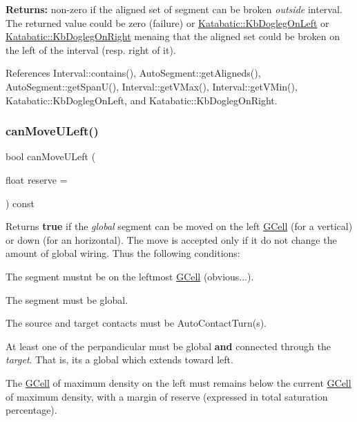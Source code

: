 {\bfseries Returns\+:} non-\/zero if the aligned set of segment can be broken {\itshape outside} {\ttfamily interval}. The returned value could be zero (failure) or \hyperlink{namespaceKatabatic_a2af2ad6b6441614038caf59d04b3b217a67bb7c53bbbc73a0e2d1f3f3e16ab679}{Katabatic\+::\+Kb\+Dogleg\+On\+Left} or \hyperlink{namespaceKatabatic_a2af2ad6b6441614038caf59d04b3b217afe7fcb4c332f36e477433169b3d3f515}{Katabatic\+::\+Kb\+Dogleg\+On\+Right} menaing that the aligned set could be broken on the left of the {\ttfamily interval} (resp. right of it). 

References Interval\+::contains(), Auto\+Segment\+::get\+Aligneds(), Auto\+Segment\+::get\+Span\+U(), Interval\+::get\+V\+Max(), Interval\+::get\+V\+Min(), Katabatic\+::\+Kb\+Dogleg\+On\+Left, and Katabatic\+::\+Kb\+Dogleg\+On\+Right.

\mbox{\label{classKatabatic_1_1AutoSegment_aad55626c9d793a0b08bcff5be2a5ad0c}} 
\subsubsection{\texorpdfstring{can\+Move\+U\+Left()}{canMoveULeft()}}
{\footnotesize\ttfamily bool can\+Move\+U\+Left (\begin{DoxyParamCaption}\item[{float}]{reserve = {} }\end{DoxyParamCaption}) const\hspace{0.3cm}{\ttfamily [pure virtual]}}

\begin{DoxyReturn}{Returns}
{\bfseries true} if the {\itshape global} segment can be moved on the left \hyperlink{classKatabatic_1_1GCell}{G\+Cell} (for a vertical) or down (for an horizontal). The move is accepted only if it do not change the amount of global wiring. Thus the following conditions\+:
\begin{DoxyItemize}
\item The segment mustn\textquotesingle{}t be on the leftmost \hyperlink{classKatabatic_1_1GCell}{G\+Cell} (obvious...).
\item The segment must be global.
\item The source and target contacts must be Auto\+Contact\+Turn(s).
\item At least one of the perpandicular must be global {\bfseries and} connected through the {\itshape target}. That is, it\textquotesingle{}s a global which extends toward left.
\item The \hyperlink{classKatabatic_1_1GCell}{G\+Cell} of maximum density on the left must remains below the current \hyperlink{classKatabatic_1_1GCell}{G\+Cell} of maximum density, with a margin of {\ttfamily reserve} (expressed in total saturation percentage). 
\end{DoxyItemize}
\end{DoxyReturn}


